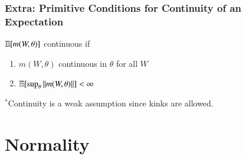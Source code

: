 \documentclass[../main.tex]{subfiles}
\begin{document}
\subsubsection{Extra: Primitive Conditions for Continuity of an Expectation}
$\operatorname{\mathbb{E}}[m(W, \theta)]$ continuous if 
\begin{enumerate}[noitemsep]
\item $m(W, \theta)$ continuous in $\theta$ for all $W$
\item $\operatorname{\mathbb{E}}[\sup_{\theta} \Vert m(W, \theta)\Vert] < \infty$
\end{enumerate}
$^*$Continuity is a weak assumption since kinks are allowed.


\section{Normality}
\end{document}
